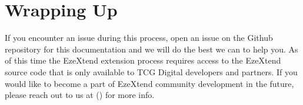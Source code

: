 \documentclass[letterpaper,10pt,english]{sphinxmanual}
\begin{document}
\begin{DUlineblock}{0em}
\item[] 
\end{DUlineblock}

\sphinxstepscope


\chapter{Wrapping Up}
\label{\detokenize{wrapping_up:wrapping-up}}\label{\detokenize{wrapping_up::doc}}
\sphinxAtStartPar
If you encounter an issue during this process, open an issue on the Github repository for this documentation  and we will do the best we can to help you. As of this time the EzeXtend extension process requires access to the EzeXtend source code that is only available to TCG Digital developers and partners. If you would like to become a part of EzeXtend community development in the future, please reach out to us at () for more info.



\renewcommand{\indexname}{Index}
\printindex
\end{document}
